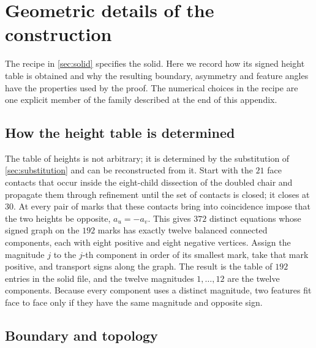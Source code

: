 \section{Geometric details of the construction}\label{app:solidchecks}

The recipe in \cref{sec:solid} specifies the solid. Here we record how its signed
height table is obtained and why the resulting boundary, asymmetry and feature
angles have the properties used by the proof. The numerical choices in the recipe
are one explicit member of the family described at the end of this appendix.

\subsection{How the height table is determined}\label{app:profile}

The table of heights is not arbitrary; it is determined by the substitution of
\cref{sec:substitution} and can be reconstructed from it. Start with the $21$ face contacts that
occur inside the eight-child dissection of the doubled chair and propagate them through
refinement until the set of contacts is closed; it closes at $30$. At every pair of marks that
these contacts bring into coincidence impose that the two heights be opposite, $a_u=-a_v$. This
gives $372$ distinct equations whose signed graph on the $192$ marks has exactly twelve balanced
connected components, each with eight positive and eight negative vertices. Assign the magnitude
$j$ to the $j$-th component in order of its smallest mark, take that mark positive, and transport
signs along the graph. The result is the table of $192$ entries in the solid file, and the twelve
magnitudes $1,\dots,12$ are the twelve components. Because every component uses a distinct
magnitude, two features fit face to face only if they have the same magnitude and opposite sign.

\subsection{Boundary and topology}\label{app:boundary}

